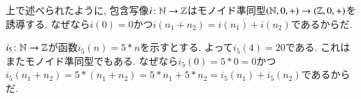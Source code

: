 \begin{example}[From $\NN$ to $\ZZ$]\label{ex:nat to int}


上で述べられたように, 包含写像$i\colon{\mathbb N}\rightarrow{\mathbb Z}$はモノイド準同型$({\mathbb N},0,+)\rightarrow({\mathbb Z},0,+)$を誘導する. なぜなら$i(0)=0$かつ$i(n_1+n_2)=i(n_1)+i(n_2)$であるからだ.


$i_5\colon{\mathbb N}\rightarrow{\mathbb Z}$が函数$i_5(n)=5*n$を示すとする. よって$i_5(4)=20$である. これはまたモノイド準同型でもある. なぜなら$i_5(0)=5*0=0$かつ$i_5(n_1+n_2)=5*(n_1+n_2)=5*n_1+5*n_2=i_5(n_1)+i_5(n_2)$であるからだ.

\end{example}

